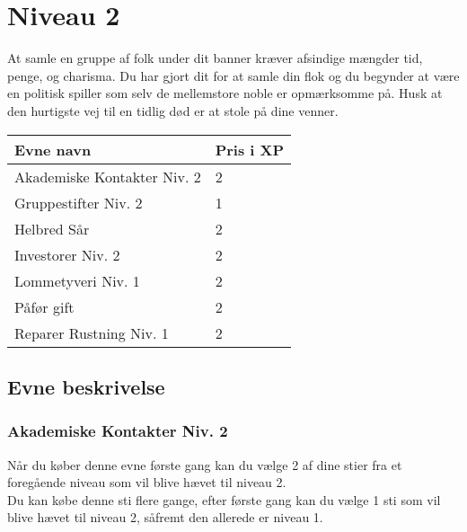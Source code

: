 \chapter*{Niveau 2}
At samle en gruppe af folk under dit banner kræver afsindige mængder tid, penge, og charisma. Du har gjort dit for at samle din flok og du begynder at være en politisk spiller som selv de mellemstore noble er opmærksomme på. Husk at den hurtigste vej til en tidlig død er at stole på dine venner.

\begin{table}[H]
    \centering
    \begin{tabular}{|p{}|p{}|}
    \rowcolor{cerulean!80}\hline
        Evne navn & Pris i XP \\\hline         
         Akademiske Kontakter Niv. 2 & 2 \\\hline
         Gruppestifter Niv. 2 & 1 \\\hline
         Helbred Sår & 2 \\\hline
         Investorer Niv. 2 & 2 \\\hline
         Lommetyveri Niv. 1 & 2 \\\hline
         Påfør gift & 2 \\\hline
         Reparer Rustning Niv. 1 & 2 \\\hline
    \end{tabular}
\end{table}
\section*{Evne beskrivelse}

\subsection*{Akademiske Kontakter Niv. 2}

Når du køber denne evne første gang kan du vælge 2 af dine stier fra et foregående niveau som vil blive hævet til niveau 2.\\
Du kan købe denne sti flere gange, efter første gang kan du vælge 1 sti som vil blive hævet til niveau 2, såfremt den allerede er niveau 1. \\

